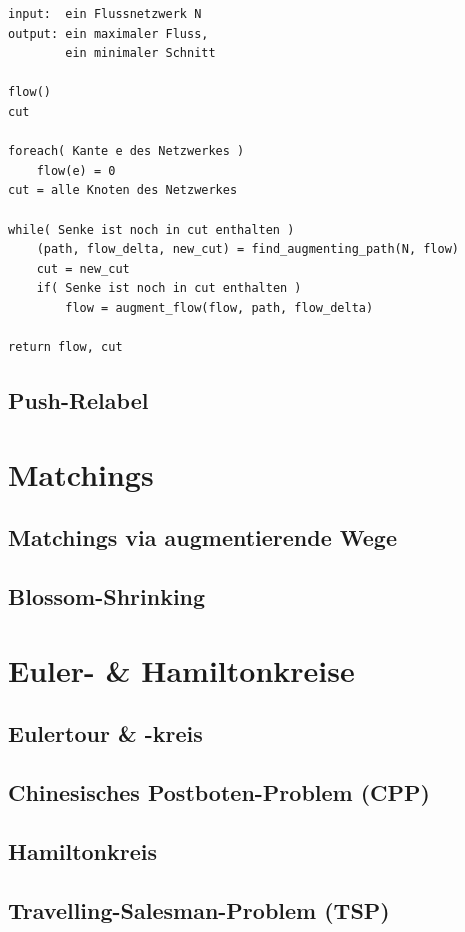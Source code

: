 \documentclass[10pt,a4paper,landscape]{article}
\begin{document}
\begin{multicols*}{2}
    \begin{verbatim}
input:  ein Flussnetzwerk N
output: ein maximaler Fluss,
        ein minimaler Schnitt

flow()
cut

foreach( Kante e des Netzwerkes )
    flow(e) = 0
cut = alle Knoten des Netzwerkes

while( Senke ist noch in cut enthalten )
    (path, flow_delta, new_cut) = find_augmenting_path(N, flow)
    cut = new_cut
    if( Senke ist noch in cut enthalten )
        flow = augment_flow(flow, path, flow_delta)

return flow, cut
    \end{verbatim}

    \subsection{ Push-Relabel }


\section{ Matchings }
    \subsection{ Matchings via augmentierende Wege }

    \subsection{ Blossom-Shrinking }


\section{ Euler- \& Hamiltonkreise }
    \subsection{ Eulertour \& -kreis}

    \subsection{ Chinesisches Postboten-Problem (CPP) }

    \subsection{ Hamiltonkreis }

    \subsection{ Travelling-Salesman-Problem (TSP) }



\end{multicols*}
\end{document}
